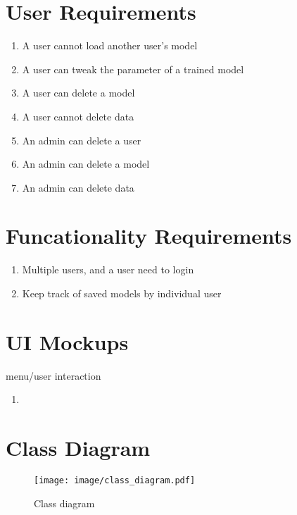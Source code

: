 \documentclass[11pt]{article}
\begin{document}
\section{User Requirements}
\begin{enumerate}[leftmargin=4\parindent]
 \item A user cannot load another user's model
 \item A user can tweak the parameter of a trained model
 \item A user can delete a model
 \item A user cannot delete data
 \item An admin can delete a user
 \item An admin can delete a model
 \item An admin can delete data
\end{enumerate}

\section{Funcationality Requirements}
\begin{enumerate}[leftmargin=4\parindent]
 \item Multiple users, and a user need to login
 \item Keep track of saved models by individual user
\end{enumerate}

\section{UI Mockups}
menu/user interaction
\begin{enumerate}[leftmargin=4\parindent]
 \item 
\end{enumerate}

\section{Class Diagram}

\begin{figure}[tb]
 \centering
     {\texttt{[image: image/class\_diagram.pdf]}}
    \vspace{-2ex}
     \caption{\label{fig:class_diagram}  
        Class diagram
     }
\end{figure}



\end{document}
